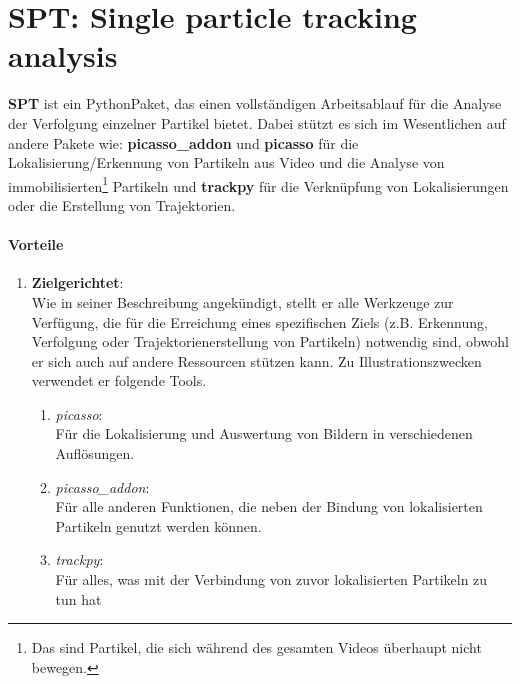 
\section{SPT: Single particle tracking analysis \label{kap1_STP}}
\textbf{SPT} \cite{spt_stehr_stein_2020} ist ein Python\-Paket, das einen vollständigen Arbeitsablauf für die Analyse der Verfolgung einzelner Partikel bietet. Dabei stützt es sich im Wesentlichen auf andere Pakete wie: \textbf{picasso\_addon} \cite{picasso_addon_schwille-paint_2020} und \textbf{picasso} \cite{picasso_jungmannlab_2019} für die Lokalisierung/Erkennung von Partikeln aus Video und die Analyse von immobilisierten\footnote{Das sind Partikel, die sich während des gesamten Videos überhaupt nicht bewegen.} Partikeln und \textbf{trackpy} \cite{trackpy_allan_daniel_b_2021_4682814} für die Verknüpfung von Lokalisierungen oder die Erstellung von Trajektorien.

	\paragraph{Vorteile}
		\begin{enumerate}
    			\item \textbf{Zielgerichtet}:\\
				Wie in seiner Beschreibung angekündigt, stellt er alle Werkzeuge zur Verfügung, die für die Erreichung eines spezifischen Ziels (z.B. Erkennung, Verfolgung oder Trajektorienerstellung von Partikeln) notwendig sind, obwohl er sich auch auf andere Ressourcen stützen kann. Zu Illustrationszwecken verwendet er folgende Tools.
				
				\begin{enumerate}
					\item \textit{picasso}:\\
				 		Für die Lokalisierung und Auswertung von Bildern in verschiedenen Auflösungen.
					\item \textit{picasso\_addon}:\\
						Für alle anderen Funktionen, die neben der Bindung von lokalisierten Partikeln genutzt werden 								können.
					\item \textit{trackpy}:\\
						Für alles, was mit der Verbindung von zuvor lokalisierten Partikeln zu tun hat
				\end{enumerate}
    			
		\end{enumerate}
		

